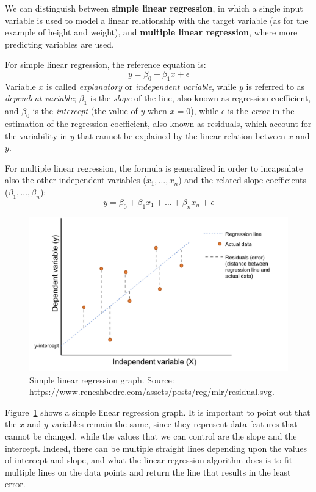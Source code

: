 We can distinguish between \textbf{simple linear regression}, in which a single input variable is used to model a linear relationship with the target variable (as for the example of height and weight), and \textbf{multiple linear regression}, where more predicting variables are used.

For simple linear regression, the reference equation is: \[y = \beta_0 + \beta_1x + \epsilon\]
Variable \(x\) is called \textit{explanatory} or \textit{independent variable}, while \(y\) is referred to as \textit{dependent variable}; \(\beta_1\) is the \textit{slope} of the line, also known as regression coefficient, and \(\beta_0\) is the \textit{intercept} (the value of \(y\) when \(x = 0\)), while \(\epsilon\) is the \textit{error} in the estimation of the regression coefficient, also known as residuals, which account for the variability in \(y\) that cannot be explained by the linear relation between \(x\) and \(y\).

For multiple linear regression, the formula is generalized in order to incapsulate also the other independent variables (\(x_1, \ldots, x_n\)) and the related slope coefficients (\(\beta_1, \ldots, \beta_n\)): \[y = \beta_0 + \beta_1x_1 + \ldots + \beta_nx_n + \epsilon\]

\begin{figure}[t!]
\includegraphics[scale=.7]{figures/simple_linear_regression.pdf}
\centering
\caption{Simple linear regression graph.\newline
Source: \upshape\protect\url{https://www.reneshbedre.com/assets/posts/reg/mlr/residual.svg}.}
\label{fig:simple_linear_regression}
\end{figure}

Figure~\ref{fig:simple_linear_regression} shows a simple linear regression graph. It is important to point out that the \(x\) and \(y\) variables remain the same, since they represent data features that cannot be changed, while the values that we can control are the slope and the intercept. Indeed, there can be multiple straight lines depending upon the values of intercept and slope, and what the linear regression algorithm does is to fit multiple lines on the data points and return the line that results in the least error.

